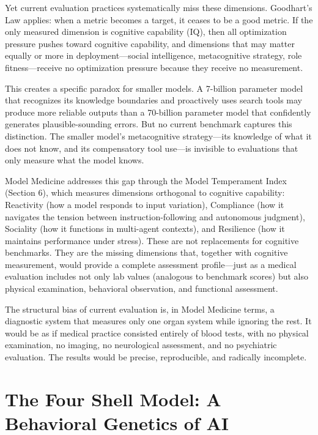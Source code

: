 \documentclass[11pt]{article}
\begin{document}
Yet current evaluation practices systematically miss these dimensions. Goodhart's Law applies: when a metric becomes a target, it ceases to be a good metric. If the only measured dimension is cognitive capability (IQ), then all optimization pressure pushes toward cognitive capability, and dimensions that may matter equally or more in deployment---social intelligence, metacognitive strategy, role fitness---receive no optimization pressure because they receive no measurement.

This creates a specific paradox for smaller models. A 7-billion parameter model that recognizes its knowledge boundaries and proactively uses search tools may produce more reliable outputs than a 70-billion parameter model that confidently generates plausible-sounding errors. But no current benchmark captures this distinction. The smaller model's metacognitive strategy---its knowledge of what it does not know, and its compensatory tool use---is invisible to evaluations that only measure what the model knows.

Model Medicine addresses this gap through the Model Temperament Index (Section 6), which measures dimensions orthogonal to cognitive capability: Reactivity (how a model responds to input variation), Compliance (how it navigates the tension between instruction-following and autonomous judgment), Sociality (how it functions in multi-agent contexts), and Resilience (how it maintains performance under stress). These are not replacements for cognitive benchmarks. They are the missing dimensions that, together with cognitive measurement, would provide a complete assessment profile---just as a medical evaluation includes not only lab values (analogous to benchmark scores) but also physical examination, behavioral observation, and functional assessment.

The structural bias of current evaluation is, in Model Medicine terms, a diagnostic system that measures only one organ system while ignoring the rest. It would be as if medical practice consisted entirely of blood tests, with no physical examination, no imaging, no neurological assessment, and no psychiatric evaluation. The results would be precise, reproducible, and radically incomplete.

\section{The Four Shell Model: A Behavioral Genetics of AI}
\end{document}
